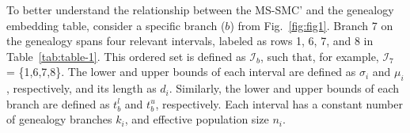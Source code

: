 \documentclass[11pt]{article}
\begin{document}
To better understand the relationship between the MS-SMC' and the genealogy
embedding table, consider a specific branch ($b$) from Fig.~\ref{fig:fig1}. 
Branch 7 on the genealogy spans four relevant intervals, 
labeled as rows 1, 6, 7, and 8 in Table~\ref{tab:table-1}.
This ordered set is defined as $\mathcal{I}_b$, such that, for example, 
$\mathcal{I}_7$ = \{1,6,7,8\}. 
The lower and upper bounds of each interval are defined as 
$\sigma_i$ and $\mu_i$, respectively, and its length as $d_i$. 
Similarly, the lower and upper bounds of each branch are defined 
as $t_b^l$ and $t_b^u$, respectively. Each interval has a constant 
number of genealogy branches $k_i$, and effective population size $n_i$.
\end{document}
